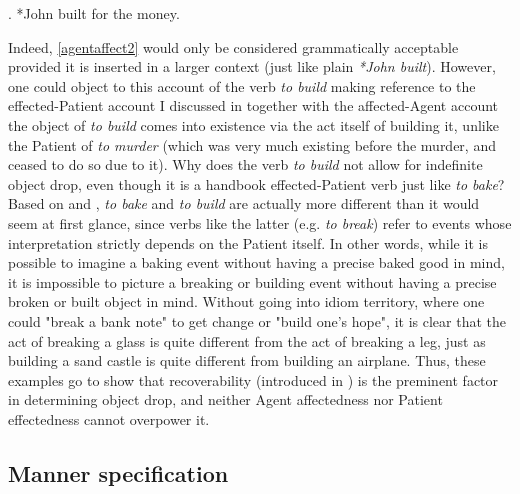 \ex. \label{agentaffect2} *John built for the money.

Indeed, \ref{agentaffect2} would only be considered grammatically acceptable provided it is inserted in a larger context (just like plain \textit{*John built}). However, one could object to this account of the verb \textit{to build} making reference to the effected-Patient account I discussed in  together with the affected-Agent account \textemdash the object of \textit{to build} comes into existence via the act itself of building it, unlike the Patient of \textit{to murder} (which was very much existing before the murder, and ceased to do so due to it). Why does the verb \textit{to build} not allow for indefinite object drop, even though it is a handbook effected-Patient verb just like \textit{to bake}? Based on \textcite[512]{Goldberg2001} and \textcite[139]{Naess2007}, \textit{to bake} and \textit{to build} are actually more different than it would seem at first glance, since verbs like the latter (e.g. \textit{to break}) refer to events whose interpretation strictly depends on the Patient itself. In other words, while it is possible to imagine a baking event without having a precise baked good in mind, it is impossible to picture a breaking or building event without having a precise broken or built object in mind. Without going into idiom territory, where one could "break a bank note" to get change or "build one's hope", it is clear that the act of breaking a glass is quite different from the act of breaking a leg, just as building a sand castle is quite different from building an airplane. Thus, these examples go to show that recoverability (introduced in ) is the preminent factor in determining object drop, and neither Agent affectedness nor Patient effectedness cannot overpower it.


\subsection{Manner specification} 

